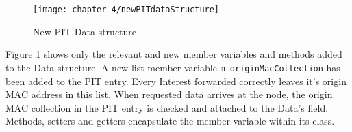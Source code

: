 \vspace{5mm} %

\begin{figure}[H]
  \centering
  \texttt{[image: chapter-4/newPITdataStructure]}
  \caption{New PIT Data structure}
  \label{fig:newPITdataStructure}
\end{figure}

\vspace{5mm} %

Figure \ref{fig:newPITdataStructure} shows only the relevant and new member variables and methods added to the Data structure. A new list member variable \texttt{m\_originMacCollection} has been added to the PIT entry. Every Interest forwarded correctly leaves it's origin MAC address in this list. When requested data arrives at the node, the origin MAC collection in the PIT entry is checked and attached to the Data's field. Methods, setters and getters encapsulate the member variable within its class.





